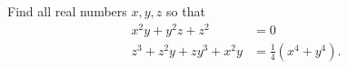 Find all real numbers $x,y,z$ so that
\begin{align*}
    x^2 y + y^2 z + z^2 &= 0 \\
    z^3 + z^2 y + z y^3 + x^2 y &= \frac{1}{4}(x^4 + y^4).
\end{align*}